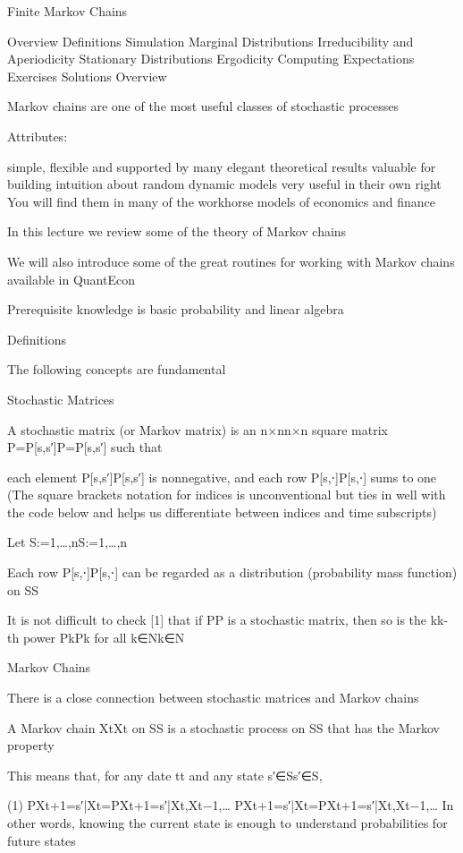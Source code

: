 Finite Markov Chains

Overview
Definitions
Simulation
Marginal Distributions
Irreducibility and Aperiodicity
Stationary Distributions
Ergodicity
Computing Expectations
Exercises
Solutions
Overview

Markov chains are one of the most useful classes of stochastic processes

Attributes:

simple, flexible and supported by many elegant theoretical results
valuable for building intuition about random dynamic models
very useful in their own right
You will find them in many of the workhorse models of economics and finance

In this lecture we review some of the theory of Markov chains

We will also introduce some of the great routines for working with Markov chains available in QuantEcon

Prerequisite knowledge is basic probability and linear algebra

Definitions

The following concepts are fundamental

Stochastic Matrices

A stochastic matrix (or Markov matrix) is an n×nn×n square matrix P=P[s,s′]P=P[s,s′] such that

each element P[s,s′]P[s,s′] is nonnegative, and
each row P[s,⋅]P[s,⋅] sums to one
(The square brackets notation for indices is unconventional but ties in well with the code below and helps us differentiate between indices and time subscripts)

Let S:={1,…,n}S:={1,…,n}

Each row P[s,⋅]P[s,⋅] can be regarded as a distribution (probability mass function) on SS

It is not difficult to check [1] that if PP is a stochastic matrix, then so is the kk-th power PkPk for all k∈Nk∈N

Markov Chains

There is a close connection between stochastic matrices and Markov chains

A Markov chain {Xt}{Xt} on SS is a stochastic process on SS that has the Markov property

This means that, for any date tt and any state s′∈Ss′∈S,

(1)
P{Xt+1=s′|Xt}=P{Xt+1=s′|Xt,Xt−1,…}
P{Xt+1=s′|Xt}=P{Xt+1=s′|Xt,Xt−1,…}
In other words, knowing the current state is enough to understand probabilities for future states

